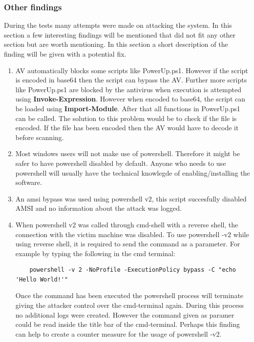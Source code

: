 \documentclass{article}%
\begin{document}
\subsubsection{Other findings}
During the tests many attempts were made on attacking the system. In this section a few interesting findings will be mentioned that did not fit any other section but are worth mentioning. In this section a short description of the finding will be given with a potential fix.
\begin{enumerate}
	\item AV automatically blocks some scripts like PowerUp.ps1. However if the script is encoded in base64 then the script can bypass the AV. Further more scripts like PowerUp.ps1 are blocked by the antivirus when execution is attempted using \textbf{Invoke-Expression}. However when encoded to base64, the script can be loaded using \textbf{Import-Module}. After that all functions in PowerUp.ps1 can be called. The solution to this problem would be to check if the file is encoded. If the file has been encoded then the AV would have to decode it before scanning.
	\item Most windows users will not make use of powershell. Therefore it might be safer to have powershell disabled by default. Anyone who needs to use powershell will usually have the technical knowlegde of enabling/installing the software.
	\item An amsi bypass was used using powershell v$2$, this script succesfully disabled AMSI and no information about the attack was logged.
	\item When powershell v$2$ was called through cmd-shell with a reverse shell, the connection with the victim machine was disabled. To use powershell -v$2$ while using reverse shell, it is required to send the command as a parameter.
	For example by typing the following in the cmd terminal:
	\begin{verbatim}
	powershell -v 2 -NoProfile -ExecutionPolicy bypass -C "echo 'Hello World!'"
	\end{verbatim}
	Once the command has been executed the powershell process will terminate giving the attacker control over the cmd-terminal again. During this process no additional logs were created. However the command given as paramer could be read inside the title bar of the cmd-terminal. Perhaps this finding can help to create a counter measure for the usage of powershell -v$2$.
\end{enumerate}
\end{document}

